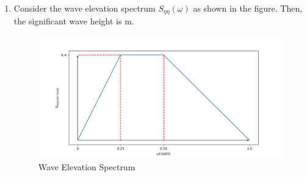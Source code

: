 \begin{enumerate}[label=\thechapter.\arabic*,ref=\thechapter.\theenumi]
\item Consider the wave elevation spectrum $S_{\eta \eta}(\omega)$ as shown in the figure. Then, the significant wave height is \underline{\hspace{3cm}} m.
\begin{figure}[H]
    \centering
    \includegraphics[width=\columnwidth]{2022/NM/40/figs/qfig.png}
    \caption{Wave Elevation Spectrum}
    \label{fig: GATE22NM40.1}
\end{figure}


\end{enumerate}
